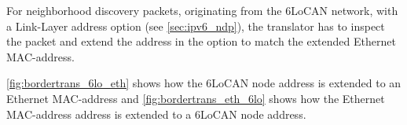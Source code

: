 For neighborhood discovery packets, originating from the 6LoCAN network, with a Link-Layer address option (see \autoref{sec:ipv6_ndp}),
the translator has to inspect the packet and extend the address in the option to match the extended Ethernet MAC-address.




\autoref{fig:bordertrans_6lo_eth} shows how the 6LoCAN node address is extended to an Ethernet MAC-address and 
\autoref{fig:bordertrans_eth_6lo} shows how the Ethernet MAC-address address is extended to a 6LoCAN node address.
